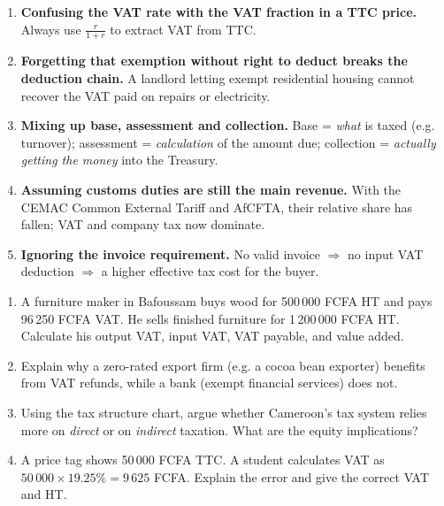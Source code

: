 \documentclass[11pt]{article}
\begin{document}
\begin{attention}
\begin{enumerate}
    \item \textbf{Confusing the VAT rate with the VAT fraction in a TTC price.} Always use $\frac{r}{1+r}$ to extract VAT from TTC.
    \item \textbf{Forgetting that exemption without right to deduct breaks the deduction chain.} A landlord letting exempt residential housing cannot recover the VAT paid on repairs or electricity.
    \item \textbf{Mixing up base, assessment and collection.} Base = \emph{what} is taxed (e.g. turnover); assessment = \emph{calculation} of the amount due; collection = \emph{actually getting the money} into the Treasury.
    \item \textbf{Assuming customs duties are still the main revenue.} With the CEMAC Common External Tariff and AfCFTA, their relative share has fallen; VAT and company tax now dominate.
    \item \textbf{Ignoring the invoice requirement.} No valid invoice $\Rightarrow$ no input VAT deduction $\Rightarrow$ a higher effective tax cost for the buyer.
\end{enumerate}
\end{attention}

\begin{exercice}
\begin{enumerate}
    \item A furniture maker in Bafoussam buys wood for 500\,000 FCFA HT and pays 96\,250 FCFA VAT. He sells finished furniture for 1\,200\,000 FCFA HT. Calculate his output VAT, input VAT, VAT payable, and value added.
    \item Explain why a zero-rated export firm (e.g. a cocoa bean exporter) benefits from VAT refunds, while a bank (exempt financial services) does not.
    \item Using the tax structure chart, argue whether Cameroon's tax system relies more on \emph{direct} or on \emph{indirect} taxation. What are the equity implications?
    \item A price tag shows 50\,000 FCFA TTC. A student calculates VAT as $50\,000 \times 19.25\% = 9\,625$ FCFA. Explain the error and give the correct VAT and HT.
\end{enumerate}
\end{exercice}
\end{document}
